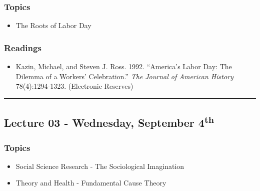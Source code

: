 \documentclass[]{book}
\providecommand{\tightlist}{%
  \setlength{\itemsep}{0pt}\setlength{\parskip}{0pt}}
\begin{document}
\hypertarget{topics-2}{%
\subsubsection*{Topics}\label{topics-2}}

\begin{itemize}
\tightlist
\item
  The Roots of Labor Day
\end{itemize}

\hypertarget{readings-2}{%
\subsubsection*{Readings}\label{readings-2}}

\begin{itemize}
\tightlist
\item
  Kazin, Michael, and Steven J. Ross. 1992. ``America's Labor Day: The Dilemma of a Workers' Celebration.'' \emph{The Journal of American History} 78(4):1294-1323. (Electronic Reserves)
\end{itemize}

\begin{center}\rule{0.5\linewidth}{\linethickness}\end{center}

\hypertarget{lecture-03---wednesday-september-4th}{%
\subsection*{\texorpdfstring{Lecture 03 - Wednesday, September 4\textsuperscript{th}}{Lecture 03 - Wednesday, September 4th}}\label{lecture-03---wednesday-september-4th}}

\hypertarget{topics-3}{%
\subsubsection*{Topics}\label{topics-3}}

\begin{itemize}
\tightlist
\item
  Social Science Research - The Sociological Imagination
\item
  Theory and Health - Fundamental Cause Theory
\end{itemize}
\end{document}

